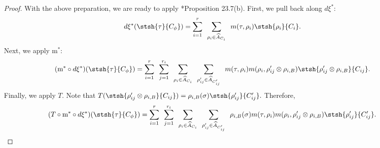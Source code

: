 \documentclass[11pt,letterpaper]{amsart}
\newcommand{\calm}{\textrm{m}}
\numberwithin{equation}{section}
\begin{document}
\begin{proof}
With the above preparation, we are ready to apply \cite{ABV92}*{Proposition 23.7(b)}. First, we pull back along $d{\xi^{\ast}}$:
\begin{align*}
    d\xi^{\ast} ( \stsh{\tau}{C_{\phi}} )
    &=  
    \sum_{ i=1 }^r 
    \hskip5pt 
    \sum_{\rho_i \in \widehat{A}_{C_i}} 
    \hskip5pt
    m(\tau, \rho_i) \stsh{\rho_i}{C_i}.
\end{align*}
Next, we apply $\calm^{\ast}$:
\begin{align*}
    ( \calm^{\ast} \circ d\xi^{\ast}) ( \stsh{\tau}{C_{\phi}} )
    &=  
    \sum_{ i=1 }^r 
    \hskip5pt \sum_{ j=1 }^{r_i} 
    \hskip5pt 
    \sum_{\rho_i \in \widehat{A}_{C_i}}  
    \hskip5pt
     \sum_{\rho_{ij}' \in \widehat{A}_{C_{ij}'}} 
    \hskip5pt
    m(\tau, \rho_i) m(\rho_i, \rho_{ij}' \otimes \rho_{i,B})\stsh{\rho_{ij}'\otimes \rho_{i,B}}{C_{ij}}.
\end{align*}
Finally, we apply $T$. Note that $T(\stsh{\rho_{ij}'\otimes \rho_{i,B}}{C_{ij}})= \rho_{i,B}(\sigma) \stsh{\rho_{ij}'}{C_{ij}'}. $ 
Therefore,
\begin{align}\label{equation: Lift=Trans 3}
    (T \circ  \calm^{\ast} \circ d\xi^{\ast}) ( \stsh{\tau}{C_{\phi}} )
    &=  
    \sum_{ i=1 }^r 
    \hskip5pt \sum_{ j=1 }^{r_i} 
    \hskip5pt 
    \sum_{\rho_i \in \widehat{A}_{C_i}} 
    \hskip5pt
     \sum_{\rho_{ij}' \in \widehat{A}_{C_{ij}'}}  
    \hskip5pt
   \rho_{i,B}({\sigma}) m(\tau, \rho_i) m(\rho_i, \rho_{ij}' \otimes \rho_{i,B}) \stsh{\rho_{ij}'}{C_{ij}'}.
\end{align}


\end{proof}
\end{document}
